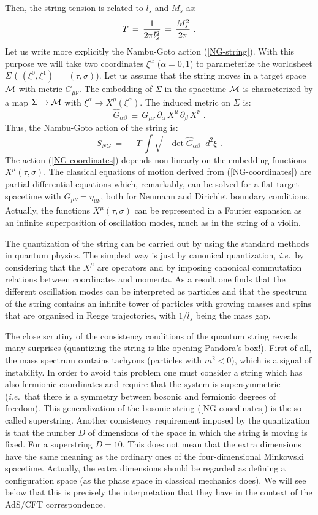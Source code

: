 \documentclass[12pt,notitlepage,a4paper]{article}
\newcommand{\beq}{\begin{equation}}
\newcommand{\eeq}{\end{equation}}
\def\ie{{\emph{i.e.}}}
\begin{document}
Then, the string tension is related to $l_s$ and $M_s$ as:
\beq
T\,=\,{1\over 2\pi l_s^2}\,=\,{M_s^2\over 2\pi}\,\,.
\eeq
Let us write more explicitly the Nambu-Goto action (\ref{NG-string}). With this purpose we will take two coordinates $\xi^{\alpha}$ ($\alpha=0,1$) to parameterize the worldsheet 
$\Sigma$ ( $(\xi^0, \xi^1)\,=\,(\tau, \sigma)$). Let us assume that the string moves in a target space  ${\cal M}$ with metric $G_{\mu\nu}$. The embedding of $\Sigma$ in the spacetime ${\cal M}$  is characterized by a map $\Sigma\rightarrow {\cal M}$ with $\xi^{\alpha}\rightarrow X^{\mu}(\xi^{\alpha})$. The induced metric on $\Sigma$ is:
\beq
\hat G_{\alpha\beta}\,\equiv \,G_{\mu\nu}\,\partial_{\alpha}\, X^{\mu}\,
\partial_{\beta}\, X^{\nu}\,\,.
\eeq
Thus, the Nambu-Goto action of the string  is:
\beq
S_{NG}\,=\,-T\,\int \sqrt{-\det \hat G_{\alpha\beta}}\,\,\,d^2\xi\,\,.
\label{NG-coordinates}
\eeq
The action  (\ref{NG-coordinates}) depends non-linearly on the embedding functions $X^{\mu} (\tau, \sigma)$. The classical equations of motion derived from (\ref{NG-coordinates}) are partial differential equations which, remarkably, can be solved for a flat target spacetime with $G_{\mu\nu}=\eta_{\mu\nu}$, both for Neumann  and Dirichlet  boundary conditions. Actually, the functions $X^{\mu} (\tau, \sigma)$ can be represented in a Fourier expansion as an infinite superposition of oscillation modes, much as in the string of a violin. 


The quantization of the string can be carried out by using the standard methods in quantum physics. The simplest way is just by canonical quantization, \ie\ by considering that the $X^{\mu}$ are operators and by imposing canonical commutation relations between coordinates and momenta. As a result one finds that the different oscillation modes can be interpreted as particles and that the spectrum of the string contains an infinite tower of particles with growing masses and spins that are organized in Regge trajectories, with $1/ l_s$ being the mass gap.

The close scrutiny of the consistency conditions of the quantum string reveals many surprises (quantizing the string is like opening Pandora's box!). First of all, the mass spectrum contains tachyons (particles with $m^2<0$), which is a signal of instability. In order to avoid this problem one must consider a string which has also fermionic coordinates and require that the system is supersymmetric (\ie\ that there is a symmetry between bosonic and fermionic degrees of freedom). This generalization of the bosonic string (\ref{NG-coordinates}) is the so-called superstring. Another consistency requirement imposed by the quantization is that the number $D$ of dimensions of the space in which the string is moving is fixed. For a superstring $D=10$. This does not mean that the extra dimensions have the same meaning as the ordinary ones of the four-dimensional Minkowski spacetime. Actually,  the extra dimensions should be regarded as defining a configuration space (as  the phase space in classical mechanics does). We will see below that this is precisely the interpretation that they have in the context of the AdS/CFT correspondence. 
\end{document}
